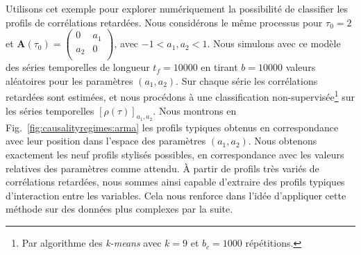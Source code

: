 Utilisons cet exemple pour explorer numériquement la possibilité de classifier les profils de corrélations retardées. Nous considérons le même processus pour $\tau_0 = 2$ et $\mathbf{A}(\tau_0) = \left( {\begin{array}{cc} 0 & a_1 \\ a_2 & 0 \\ \end{array}} \right)$, avec $-1<a_1,a_2<1$. Nous simulons avec ce modèle des séries temporelles de longueur $t_f=10000$ en tirant $b=10000$ valeurs aléatoires pour les paramètres $(a_1,a_2)$. Sur chaque série les corrélations retardées sont estimées, et nous procédons à une classification non-supervisée\footnote{Par algorithme des \emph{k-means} avec $k=9$ et $b_c = 1000$ répétitions.} sur les séries temporelles $\left[\rho(\tau)\right]_{a_1,a_2}$. Nous montrons en Fig.~\ref{fig:causalityregimes:arma} les profils typiques obtenus en correspondance avec leur position dans l'espace des paramètres $(a_1,a_2)$. Nous obtenons exactement les neuf profils stylisés possibles, en correspondance avec les valeurs relatives des paramètres comme attendu. À partir de profils très variés de corrélations retardées, nous sommes ainsi capable d'extraire des profils typiques d'interaction entre les variables. Cela nous renforce dans l'idée d'appliquer cette méthode sur des données plus complexes par la suite.




